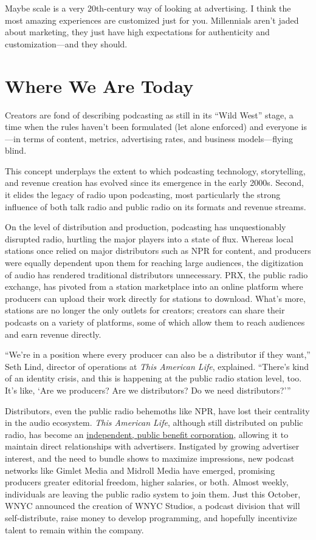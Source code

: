 \documentclass[notoc, symmetric, nobib, nols]{towcenter-guideto-book}
\begin{document}
Maybe scale is a very 20th-century way of looking at advertising. I think the most amazing experiences are customized just for you. Millennials aren't jaded about marketing, they just have high expectations for authenticity and customization---and they should.\autocite{mosel}

\chapter{Where We Are Today} 

Creators are fond of describing podcasting as still in its ``Wild West'' stage, a time when the rules haven't been formulated (let alone enforced) and everyone is---in terms of content, metrics, advertising rates, and business models---flying blind. 

This concept underplays the extent to which podcasting technology, storytelling, and revenue creation has evolved since its emergence in the early 2000s. Second, it elides the legacy of radio upon podcasting, most particularly the strong influence of both talk radio and public radio on its formats and revenue streams. 

On the level of distribution and production, podcasting has unquestionably disrupted radio, hurtling the major players into a state of flux. Whereas local stations once relied on major distributors such as NPR for content, and producers were equally dependent upon them for reaching large audiences, the digitization of audio has rendered traditional distributors unnecessary. PRX, the public radio exchange, has pivoted from a station marketplace into an online platform where producers can upload their work directly for stations to download. What's more, stations are no longer the only outlets for creators; creators can share their podcasts on a variety of platforms, some of which allow them to reach audiences and earn revenue directly.

``We're in a position where every producer can also be a distributor if they want,'' Seth Lind, director of operations at \textit{This American Life}, explained. ``There's kind of an identity crisis, and this is happening at the public radio station level, too. It's like, `Are we producers? Are we distributors? Do we need distributors?'''\autocite{lind}

Distributors, even the public radio behemoths like NPR, have lost their centrality in the audio ecosystem. \textit{This American Life}, although still distributed on public radio, has become an \href{http://current.org/2015/07/ira-glass-starts-own-company-for-this-american-life-serial/}{independent, public benefit corporation}, allowing it to maintain direct relationships with advertisers.\autocite{talpbc} Instigated by growing advertiser interest, and the need to bundle shows to maximize impressions, new podcast networks like Gimlet Media and Midroll Media have emerged, promising producers greater editorial freedom, higher salaries, or both. Almost weekly, individuals are leaving the public radio system to join them. Just this October, WNYC announced the creation of WNYC Studios, a podcast division that will self-distribute, raise money to develop programming, and hopefully incentivize talent to remain within the company.\autocite{wnycstudios}
\end{document}
